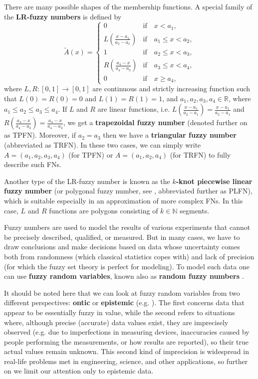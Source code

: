 There are many possible shapes of the membership functions.
A special family of the \textbf{LR-fuzzy numbers} is defined by
\begin{equation} 
\tilde{A}(x)=
\begin{cases}
 0 & \text{if}\quad x < a_1,  \\
 L \left( \frac{x-a_1}{a_2 - a_1}\right) & \text{if}\quad a_1 \leqslant x < a_2 ,  \\
 1 & \text{if}\quad a_2 \leqslant x < a_3 , \\
 R \left( \frac{a_4 - x}{a_4 - a_3}\right) & \text{if}\quad a_3 \leqslant x < a_4 , \\
 0 & \text{if}\quad x \geqslant a_4,  
\end{cases}
\label{eq:LFfn}
\end{equation} 
where $L, R: [0,1] \rightarrow [0,1]$ are continuous and strictly increasing function such that $L(0)=R(0)=0$ and $L(1)=R(1)=1$, and $a_1,a_2,a_3,a_4\in\mathbb{R}$, where $a_1\leqslant a_2\leqslant a_3\leqslant a_4$. If $L$ and $R$ are linear functions, i.e. $L \left( \frac{x-a_1}{a_2 - a_1}\right) = \frac{x-a_1}{a_2 - a_1}$ and $R \left( \frac{a_4 - x}{a_4 - a_3}\right) = \frac{a_4 - x}{a_4 - a_3}$, we get a \textbf{trapezoidal fuzzy number} (denoted further on as TPFN). Moreover, if $a_2=a_3$ then we have a \textbf{triangular fuzzy number} (abbreviated as TRFN).
In these two cases, we can simply write $A=(a_1, a_2, a_3, a_4)$ (for TPFN) or $A = (a_1, a_2, a_4)$ (for TRFN) to fully describe such FNs.

Another type of the LR-fuzzy number is known as the \textbf{$k$-knot piecewise linear fuzzy number} \citep{Coroianu2019} (or polygonal fuzzy number, see \cite{Baez2012}, abbreviated further as PLFN), which is suitable especially in an approximation of more complex FNs.
In this case, $L$ and $R$ functions are polygons consisting of $k\in\mathbb{N}$ segments.

Fuzzy numbers are used to model the results of various experiments that cannot be precisely described, qualified, or measured.
But in many cases, we have to draw conclusions and make decisions based on data whose uncertainty comes both from randomness (which classical statistics copes with) and lack of precision (for which the fuzzy set theory is perfect for modeling). To model such data one can use \textbf{fuzzy random variables}, known also as \textbf{random fuzzy numbers} \citep{FRV}.

It should be noted here that we can look at fuzzy random variables from two different perspectives: \textbf{ontic} or \textbf{epistemic} (e.g. \cite{Couso2014}). The first concerns data that appear to be essentially fuzzy in value, while the second refers to situations where, although precise (accurate) data values exist, they are imprecisely observed (e.g. due to imperfections in measuring devices, inaccuracies caused by people performing the measurements, or how results are reported), so their true actual values remain unknown. This second kind of imprecision is widespread in real-life problems met in engineering, science, and other applications, so further on we limit our attention only to epistemic data.

